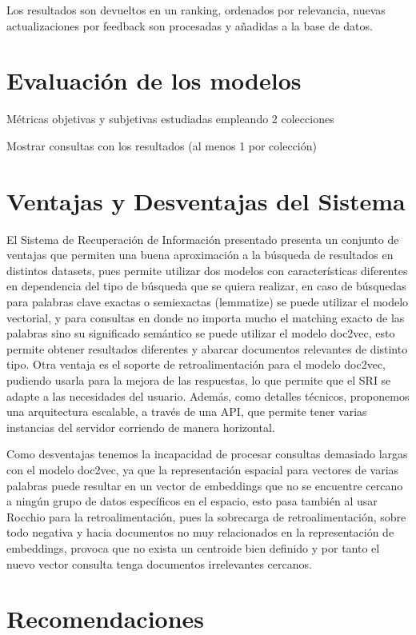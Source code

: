 \documentclass[12pt]{llncs}
\begin{document}
Los resultados son devueltos en un ranking, ordenados por relevancia, nuevas actualizaciones por feedback son procesadas y añadidas a la base de datos.

\section{Evaluación de los modelos}

Métricas objetivas y subjetivas estudiadas empleando 2 colecciones

Mostrar consultas con los resultados (al menos 1 por colección)

\section{Ventajas y Desventajas del Sistema}

El Sistema de Recuperación de Información presentado presenta un conjunto de ventajas que permiten una buena aproximación a la búsqueda de resultados en distintos datasets, pues permite utilizar dos modelos con características diferentes en dependencia del tipo de búsqueda que se quiera realizar, en caso de búsquedas para palabras clave exactas o semiexactas (lemmatize) se puede utilizar el modelo vectorial, y para consultas en donde no importa mucho el matching exacto de las palabras sino su significado semántico se puede utilizar el modelo doc2vec, esto permite obtener resultados diferentes y abarcar documentos relevantes de distinto tipo. Otra ventaja es el soporte de retroalimentación para el modelo doc2vec, pudiendo usarla para la mejora de las respuestas, lo que permite que el SRI se adapte a las necesidades del usuario. Además, como detalles técnicos, proponemos una arquitectura escalable, a través de una API, que permite tener varias instancias del servidor corriendo de manera horizontal.

Como desventajas tenemos la incapacidad de procesar consultas demasiado largas con el modelo doc2vec, ya que la representación espacial para vectores de varias palabras puede resultar en un vector de embeddings que no se encuentre cercano a ningún grupo de datos específicos en el espacio, esto pasa también al usar Rocchio para la retroalimentación, pues la sobrecarga de retroalimentación, sobre todo negativa y hacia documentos no muy relacionados en la representación de embeddings, provoca que no exista un centroide bien definido y por tanto el nuevo vector consulta tenga documentos irrelevantes cercanos.

\section*{Recomendaciones}
\end{document}

